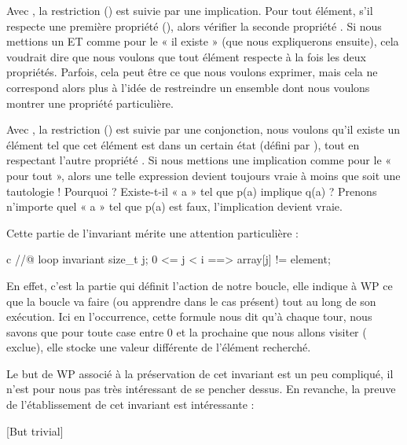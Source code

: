\documentclass[middle]{zmdocument}
\begin{document}
Avec , la restriction () est suivie
par une implication. Pour tout élément, s'il respecte une première propriété 
(), alors vérifier la seconde propriété . Si nous mettions un ET
comme pour le « il existe » (que nous expliquerons ensuite), cela voudrait dire que 
nous voulons que tout élément respecte à la fois les deux propriétés. Parfois, 
cela peut être ce que nous voulons exprimer, mais cela ne correspond alors plus 
à l'idée de restreindre un ensemble dont nous voulons montrer une propriété 
particulière.



Avec , la restriction () est suivie
par une conjonction, nous voulons qu'il existe un élément tel que cet élément 
est dans un certain état (défini par ), tout en respectant l'autre 
propriété . Si nous mettions une implication comme pour le « pour tout », 
alors une telle expression devient toujours vraie à moins que  soit une 
tautologie ! Pourquoi ? Existe-t-il « a » tel que p(a) implique q(a) ? Prenons 
n'importe quel « a » tel que p(a) est faux, l'implication devient vraie.



Cette partie de l'invariant mérite une attention particulière :



\begin{CodeBlock}{c}
//@ loop invariant \forall size_t j; 0 <= j < i ==> array[j] != element;
\end{CodeBlock}



En effet, c'est la partie qui définit l'action de notre boucle, elle indique à
WP ce que la boucle va faire (ou apprendre dans le cas présent) tout au long de
son exécution. Ici en l'occurrence, cette formule nous dit qu'à chaque tour, nous 
savons que pour toute case entre 0 et la prochaine que nous allons visiter ( exclue), elle stocke une valeur différente de l'élément recherché.



Le but de WP associé à la préservation de cet invariant est un peu compliqué, il
n'est pour nous pas très intéressant de se pencher dessus. En revanche, la 
preuve de l'établissement de cet invariant est intéressante :



[But trivial]
\end{document}
